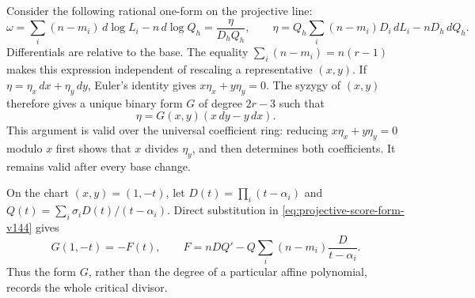 Consider the following rational one-form on the projective line:
\begin{equation}\label{eq:projective-score-form-v144}
 \omega=\sum_i(n-m_i)\,d\log L_i-n\,d\log Q_h
       =\frac{\eta}{D_hQ_h},\qquad
 \eta=Q_h\sum_i(n-m_i)D_i\,dL_i-nD_h\,dQ_h.
\end{equation}
Differentials are relative to the base.  The equality
\(\sum_i(n-m_i)=n(r-1)\) makes this expression independent
of rescaling a representative \((x,y)\).  If
\(\eta=\eta_x\,dx+\eta_y\,dy\), Euler's identity gives
\(x\eta_x+y\eta_y=0\).  The syzygy of \((x,y)\) therefore
gives a unique binary form \(G\) of degree \(2r-3\) such that
\begin{equation}\label{eq:binary-score-v144}
                   \eta=G(x,y)(x\,dy-y\,dx).
\end{equation}
This argument is valid over the universal coefficient ring: reducing
\(x\eta_x+y\eta_y=0\) modulo \(x\) first shows that
\(x\) divides \(\eta_y\), and then determines both coefficients.
It remains valid after every base change.

On the chart \((x,y)=(1,-t)\), let
\(D(t)=\prod_i(t-\alpha_i)\) and
\(Q(t)=\sum_i\sigma_iD(t)/(t-\alpha_i)\).  Direct substitution
in \eqref{eq:projective-score-form-v144} gives
\begin{equation}\label{eq:projective-affine-score-v144}
 G(1,-t)=-F(t),\qquad
 F=nDQ'-Q\sum_i(n-m_i)\frac{D}{t-\alpha_i}.
\end{equation}
Thus the form \(G\), rather than the degree of a particular affine
polynomial, records the whole critical divisor.

